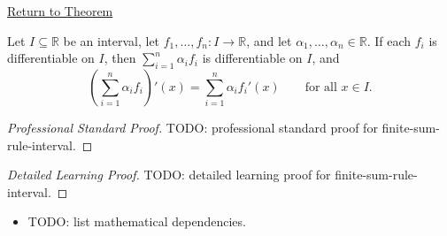 \newpage
{}
\label{prf:finite-sum-rule-interval}

\begin{remark*}[Return]
\hyperref[cor:finite-sum-rule-interval]{Return to Theorem}
\end{remark*}

\begin{corollary*}
Let $I \subseteq \mathbb{R}$ be an interval, let $f_1, \dots, f_n : I \to \mathbb{R}$, and let $\alpha_1, \dots, \alpha_n \in \mathbb{R}$. If each $f_i$ is differentiable on $I$, then $\sum_{i=1}^{n} \alpha_i f_i$ is differentiable on $I$, and
\[
\left(\sum_{i=1}^{n} \alpha_i f_i\right)'(x) = \sum_{i=1}^{n} \alpha_i f_i'(x) \qquad \text{for all } x \in I.
\]
\end{corollary*}

\begin{proof}[Professional Standard Proof]
\LRAProofBodyStart
TODO: professional standard proof for finite-sum-rule-interval.
\end{proof}

\begin{proof}[Detailed Learning Proof]
\LRAProofBodyStart
TODO: detailed learning proof for finite-sum-rule-interval.
\end{proof}

\begin{remark*}
\end{remark*}

\begin{dependencies}
\begin{itemize}
  \item TODO: list mathematical dependencies.
\end{itemize}
\end{dependencies}

\clearpage
